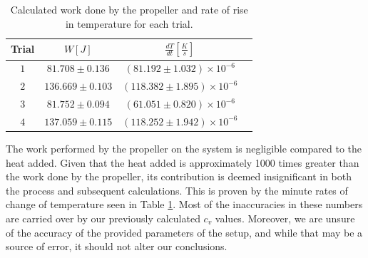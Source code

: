 \documentclass[12pt]{article}
\begin{document}
\begin{table}[h]
  \centering
  \begin{tabular}{|c|c|c|c|}
    \hline
    Trial & $W[J]$ & $\frac{dT}{dt}[\frac{K}{s}]$\\
    \hline
    $1 $& $81.708\pm0.136$ & $(81.192\pm1.032) \times 10^{-6}$\\
    $2 $& $136.669\pm0.103$ & $(118.382\pm1.895) \times 10^{-6}$\\
    $3 $& $81.752\pm0.094$ & $(61.051\pm0.820) \times 10^{-6}$\\
    $4 $& $137.059\pm0.115$ & $(118.252\pm1.942) \times 10^{-6}$\\
    \hline
  \end{tabular}
  \caption{Calculated work done by the propeller and rate of rise in temperature for each trial.}
  \label{table:temp}
\end{table}

The work performed by the propeller on the system is negligible compared to the heat added. Given that the heat added is approximately 1000 times greater than the work done by the propeller, its contribution is deemed insignificant in both the process and subsequent calculations. This is proven by the minute rates of change of temperature seen in Table \ref{table:temp}. Most of the inaccuracies in these numbers are carried over by our previously calculated $c_v$ values. Moreover, we are unsure of the accuracy of the provided parameters of the setup, and while that may be a source of error, it should not alter our conclusions.
\end{document}
